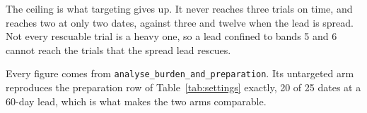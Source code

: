 The ceiling is what targeting gives up. It never reaches three trials on time, and reaches two at only two dates, against three and twelve when the lead is spread. Not every rescuable trial is a heavy one, so a lead confined to bands 5 and 6 cannot reach the trials that the spread lead rescues.

Every figure comes from \texttt{analyse\_burden\_and\_preparation}. Its untargeted arm reproduces the preparation row of Table~\ref{tab:settings} exactly, 20 of 25 dates at a 60-day lead, which is what makes the two arms comparable.
